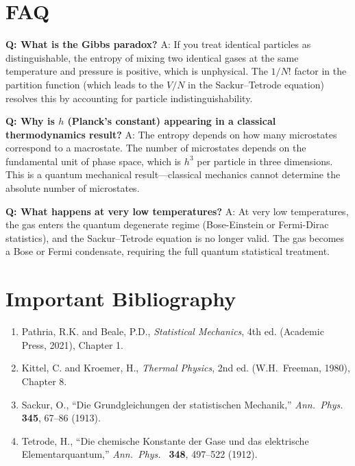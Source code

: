 \section*{FAQ}

\textbf{Q: What is the Gibbs paradox?}
A: If you treat identical particles as distinguishable, the entropy of mixing two identical gases at the same temperature and pressure is positive, which is unphysical. The $1/N!$ factor in the partition function (which leads to the $V/N$ in the Sackur--Tetrode equation) resolves this by accounting for particle indistinguishability.

\textbf{Q: Why is $h$ (Planck's constant) appearing in a classical thermodynamics result?}
A: The entropy depends on how many microstates correspond to a macrostate. The number of microstates depends on the fundamental unit of phase space, which is $h^3$ per particle in three dimensions. This is a quantum mechanical result---classical mechanics cannot determine the absolute number of microstates.

\textbf{Q: What happens at very low temperatures?}
A: At very low temperatures, the gas enters the quantum degenerate regime (Bose-Einstein or Fermi-Dirac statistics), and the Sackur--Tetrode equation is no longer valid. The gas becomes a Bose or Fermi condensate, requiring the full quantum statistical treatment.
\section*{Important Bibliography}

\begin{enumerate}
\item Pathria, R.K. and Beale, P.D., \textit{Statistical Mechanics}, 4th ed. (Academic Press, 2021), Chapter 1.
\item Kittel, C. and Kroemer, H., \textit{Thermal Physics}, 2nd ed. (W.H.\ Freeman, 1980), Chapter 8.
\item Sackur, O., ``Die Grundgleichungen der statistischen Mechanik,'' \textit{Ann.\ Phys.\ } \textbf{345}, 67--86 (1913).
\item Tetrode, H., ``Die chemische Konstante der Gase und das elektrische Elementarquantum,'' \textit{Ann.\ Phys.\ } \textbf{348}, 497--522 (1912).
\end{enumerate}

